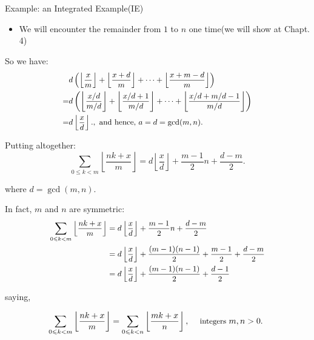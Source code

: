 \begin{frame}{Example: an Integrated Example(IE)}
{    \begin{itemize}
        \item We will encounter the remainder from $1$ to $n$ one time(we will show at Chapt. 4)
    \end{itemize}
}

 {
    So we have: 
    $$
    \small
    \begin{aligned}
    & d\left(\left\lfloor\frac{x}{m}\right\rfloor+\left\lfloor\frac{x+d}{m}\right\rfloor+\cdots+\left\lfloor\frac{x+m-d}{m}\right\rfloor\right) \\
    = & d\left(\left\lfloor\frac{x / d}{m / d}\right\rfloor+\left\lfloor\frac{x / d+1}{m / d}\right\rfloor+\cdots+\left\lfloor\frac{x / d+m / d-1}{m / d}\right\rfloor\right) \\
    = & d\left\lfloor\frac{x}{d}\right\rfloor ., \text { and hence, } a=d=\operatorname{gcd}(m, n) .
    \end{aligned}
    $$
}


 {
    Putting altogether: 
    $$\sum_{0 \leqslant k<m}\left\lfloor\frac{n k+x}{m}\right\rfloor=d\left\lfloor\frac{x}{d}\right\rfloor+\frac{m-1}{2} n+\frac{d-m}{2}.$$

    where $d=\operatorname{gcd}(m, n)$.

    
}

 {
    In fact, $m$ and $n$ are symmetric: 
    $$
    \small
\begin{aligned}
\sum_{0 \leqslant k<m}\left\lfloor\frac{n k+x}{m}\right\rfloor & =d\left\lfloor\frac{x}{d}\right\rfloor+\frac{m-1}{2} n+\frac{d-m}{2} \\
& =d\left\lfloor\frac{x}{d}\right\rfloor+\frac{(m-1)(n-1)}{2}+\frac{m-1}{2}+\frac{d-m}{2} \\
& =d\left\lfloor\frac{x}{d}\right\rfloor+\frac{(m-1)(n-1)}{2}+\frac{d-1}{2}
\end{aligned}
$$

saying, 

$$
\small
\sum_{0 \leqslant k<m}\left\lfloor\frac{n k+x}{m}\right\rfloor=\sum_{0 \leqslant k<n}\left\lfloor\frac{m k+x}{n}\right\rfloor, \quad \text { integers } m, n>0 \text {. }
$$
}

\end{frame}

